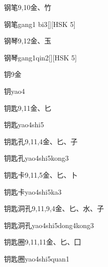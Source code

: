 \begin{entry}{钢笔}{9,10}{⾦、⽵}
  \begin{phonetics}{钢笔}{gang1 bi3}[][HSK 5]
  \end{phonetics}
\end{entry}

\begin{entry}{钢琴}{9,12}{⾦、⽟}
  \begin{phonetics}{钢琴}{gang1qin2}[][HSK 5]
  \end{phonetics}
\end{entry}

\begin{entry}{钥}{9}{⾦}
  \begin{phonetics}{钥}{yao4}
  \end{phonetics}
\end{entry}

\begin{entry}{钥匙}{9,11}{⾦、⼔}
  \begin{phonetics}{钥匙}{yao4shi5}
  \end{phonetics}
\end{entry}

\begin{entry}{钥匙孔}{9,11,4}{⾦、⼔、⼦}
  \begin{phonetics}{钥匙孔}{yao4shi5kong3}
  \end{phonetics}
\end{entry}

\begin{entry}{钥匙卡}{9,11,5}{⾦、⼔、⼘}
  \begin{phonetics}{钥匙卡}{yao4shi5ka3}
  \end{phonetics}
\end{entry}

\begin{entry}{钥匙洞孔}{9,11,9,4}{⾦、⼔、⽔、⼦}
  \begin{phonetics}{钥匙洞孔}{yao4shi5dong4kong3}
  \end{phonetics}
\end{entry}

\begin{entry}{钥匙圈}{9,11,11}{⾦、⼔、⼞}
  \begin{phonetics}{钥匙圈}{yao4shi5quan1}
  \end{phonetics}
\end{entry}

